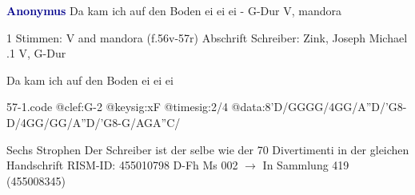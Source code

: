 \documentclass[twocolumn]{book}
\begin{document}
\newline \par \vspace{7pt} \textcolor{darkblue}{\textbf{Anonymus  }}
\newline Da kam ich auf den Boden ei ei ei - G-Dur
\newline V, mandora
\newline \begin{itshape}\end{itshape} 
\newline \textcolor{darkblue}{}  1 Stimmen: V and mandora  (f.56v-57r)
\newline Abschrift
\newline Schreiber: Zink, Joseph Michael
.1  V, G-Dur
\newline \begin{footnotesize} Da kam ich auf den Boden ei ei ei \end{footnotesize}  
\begin{filecontents*}{57-1.code}
@clef:G-2
@keysig:xF
@timesig:2/4
@data:8'D/GGGG/4GG/A''D/'G8-D/4GG/GG/A''D/'G8-G/AGA''C/
\end{filecontents*}
\newline
%
\newline Sechs Strophen
\newline Der Schreiber ist der selbe wie der 70 Divertimenti in der gleichen Handschrift
\newline RISM-ID: 455010798
\newline D-Fh  Ms 002
\newline $\rightarrow$ In Sammlung 419 (455008345)
      
\end{document}
